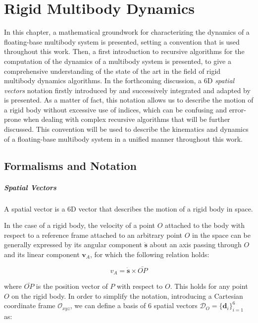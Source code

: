 \chapter{Rigid Multibody Dynamics}
\label{chp:back_RBDynamics}

In this chapter, a mathematical groundwork for characterizing the dynamics of a floating-base multibody system is presented, setting a convention that is used throughout this work. Then, a first introduction to recursive algorithms for the computation of the dynamics of a multibody system is presented, to give a comprehensive understanding of the state of the art in the field of rigid multibody dynamics algorithms. In the forthcoming discussion, a 6D \textit{spatial vectors} notation firstly introduced by \citet{featherstone_rigid_2008} and successively integrated and adapted by \citet{traversaro_multibody_2019} is presented. As a matter of fact, this notation allows us to describe the motion of a rigid body without excessive use of indices, which can be confusing and error-prone when dealing with complex recursive algorithms that will be further discussed. This convention will be used to describe the kinematics and dynamics of a floating-base multibody system in a unified manner throughout this work.

\section{Formalisms and Notation}

\paragraph{Spatial Vectors} A spatial vector is a 6D vector that describes the motion of a rigid body in space.

In the case of a rigid body, the velocity of a point $O$ attached to the body with respect to a reference frame attached to an arbitrary point $O$ in the space can be generally expressed by its angular component $\dot{\mathbf{s}}$ about an axis passing through $O$ and its linear component $\mathbf{v} _A$, for which the following relation holds:

\begin{equation}
    v _A = \dot{\mathbf{s}} \times \bar{OP}
\end{equation}

where $\bar{OP}$ is the position vector of $P$ with respect to $O$. This holds for any point $O$ on the rigid body. In order to simplify the notation, introducing a Cartesian coordinate frame $\mathcal{O} _{xyz}$, we can define a basis of 6 spatial vectors $\mathcal{D} _O = \{\mathbf{d} _i\} ^6 _{i=1}$ as:


